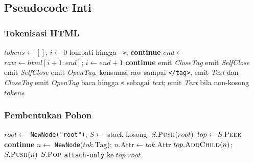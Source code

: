 \subsection{Pseudocode Inti}

\subsubsection{Tokenisasi HTML}

\begin{algorithm}[H]
\caption{Tokenize(html)}
\begin{algorithmic}[1]
\State $tokens \gets []$; $i \gets 0$
            \State lompati hingga \texttt{-->}; \textbf{continue}
        \EndIf
        \State $end \gets$  
        \State $raw \gets html[i+1 : end]$; $i \gets end+1$
         \textbf{continue} 
            \State emit \textit{CloseTag}
         \State emit \textit{SelfClose}
         \State emit \textit{SelfClose}
            \State emit \textit{OpenTag}, konsumsi raw sampai \texttt{</tag>}, emit \textit{Text} dan \textit{CloseTag}
        \Else{\ } \State emit \textit{OpenTag}
        \EndIf
    \Else
        \State baca hingga \texttt{<} sebagai \textit{text}; emit \textit{Text} bila non-kosong
    \EndIf
\EndWhile
\State \Return $tokens$
\end{algorithmic}
\end{algorithm}

\subsubsection{Pembentukan Pohon}

\begin{algorithm}[H]
\caption{Parse(tokens)}
\begin{algorithmic}[1]
\State $root \gets$ \texttt{NewNode("root")}; $S \gets$ stack kosong; $S.\Call{Push}{root}$
    \State $top \gets S.\Call{Peek}{}$
     \textbf{continue} \EndIf
        \State $n \gets$ \texttt{NewNode}($tok.\text{Tag}$); $n.\text{Attr} \gets tok.\text{Attr}$
        \State $top.\Call{AddChild}{n}$; $S.\Call{Push}{n}$
         $S.\Call{Pop}{}$ \EndIf
        \State \texttt{attach-only} ke $top$
    \EndIf
\EndFor
\State \Return $root$
\end{algorithmic}
\end{algorithm}

